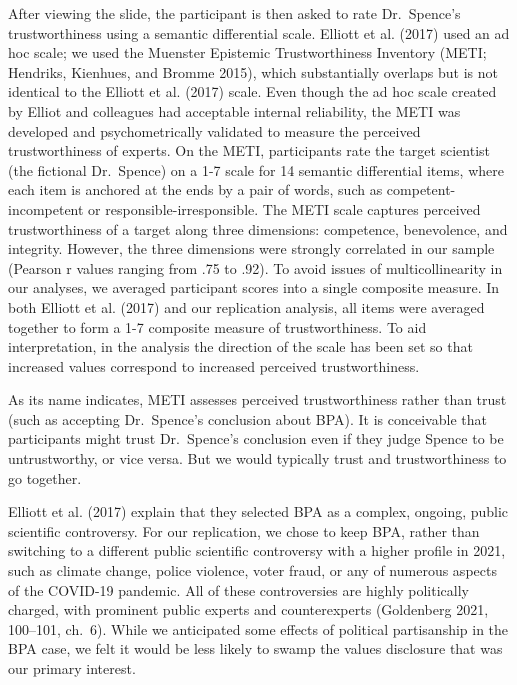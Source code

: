 \documentclass[
  letterpaper,
  DIV=11,
  numbers=noendperiod]{scrartcl}
\begin{document}
After viewing the slide, the participant is then asked to rate
Dr.~Spence's trustworthiness using a semantic differential scale.
Elliott et al. (2017) used an ad hoc scale; we used the Muenster
Epistemic Trustworthiness Inventory (METI; Hendriks, Kienhues, and
Bromme 2015), which substantially overlaps but is not identical to the
Elliott et al. (2017) scale. Even though the ad hoc scale created by
Elliot and colleagues had acceptable internal reliability, the METI was
developed and psychometrically validated to measure the perceived
trustworthiness of experts. On the METI, participants rate the target
scientist (the fictional Dr.~Spence) on a 1-7 scale for 14 semantic
differential items, where each item is anchored at the ends by a pair of
words, such as competent-incompetent or responsible-irresponsible. The
METI scale captures perceived trustworthiness of a target along three
dimensions: competence, benevolence, and integrity. However, the three
dimensions were strongly correlated in our sample (Pearson r values
ranging from .75 to .92). To avoid issues of multicollinearity in our
analyses, we averaged participant scores into a single composite
measure. In both Elliott et al. (2017) and our replication analysis, all
items were averaged together to form a 1-7 composite measure of
trustworthiness. To aid interpretation, in the analysis the direction of
the scale has been set so that increased values correspond to increased
perceived trustworthiness.

As its name indicates, METI assesses perceived trustworthiness rather
than trust (such as accepting Dr.~Spence's conclusion about BPA). It is
conceivable that participants might trust Dr.~Spence's conclusion even
if they judge Spence to be untrustworthy, or vice versa. But we would
typically trust and trustworthiness to go together.

Elliott et al. (2017) explain that they selected BPA as a complex,
ongoing, public scientific controversy. For our replication, we chose to
keep BPA, rather than switching to a different public scientific
controversy with a higher profile in 2021, such as climate change,
police violence, voter fraud, or any of numerous aspects of the COVID-19
pandemic. All of these controversies are highly politically charged,
with prominent public experts and counterexperts (Goldenberg 2021,
100--101, ch.~6). While we anticipated some effects of political
partisanship in the BPA case, we felt it would be less likely to swamp
the values disclosure that was our primary interest.
\end{document}
